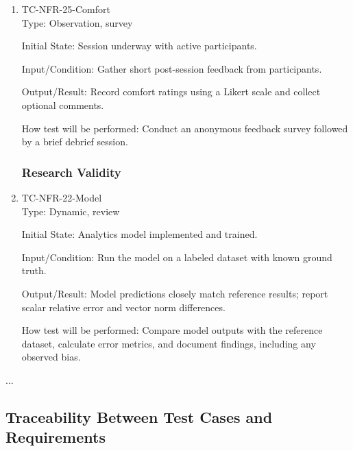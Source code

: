 \documentclass[12pt, titlepage]{article}
\begin{document}
\begin{enumerate}
\item{TC-NFR-25-Comfort\\}
Type: Observation, survey

Initial State: Session underway with active participants.

Input/Condition: Gather short post-session feedback from participants.

Output/Result: Record comfort ratings using a Likert scale and collect optional comments.

How test will be performed: Conduct an anonymous feedback survey followed by a brief debrief session.

\subsubsection{Research Validity}

\item{TC-NFR-22-Model\\}
Type: Dynamic, review

Initial State: Analytics model implemented and trained.

Input/Condition: Run the model on a labeled dataset with known ground truth.

Output/Result: Model predictions closely match reference results; report scalar relative error and vector norm differences.

How test will be performed: Compare model outputs with the reference dataset, calculate error metrics, and document findings, including any observed bias.

\end{enumerate}

...

\subsection{Traceability Between Test Cases and Requirements}
\end{document}
